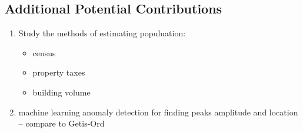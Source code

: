 \begin{singlespace*}
\section{Additional Potential Contributions}

\begin{enumerate}
\item Study the methods of estimating populuation:
	\begin{itemize}
	\item census
	\item property taxes
	\item building volume
	\end{itemize}
\item machine learning anomaly detection for finding peaks amplitude and location -- compare to Getis-Ord
\end{enumerate}

\end{singlespace*}

